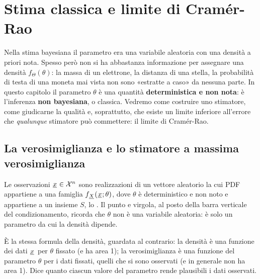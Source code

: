 \chapter{Stima classica e limite di Cramér-Rao}

Nella stima bayesiana il parametro era una variabile aleatoria con una densità a priori nota. Spesso però non si ha
abbastanza informazione per assegnare una densità $f_\Theta(\theta)$: la massa di un elettrone, la distanza di una
stella, la probabilità di testa di una moneta mai vista non sono «estratte a caso» da nessuna parte. In questo capitolo
il parametro $\theta$ è una quantità \textbf{deterministica e non nota}: è l'inferenza \textbf{non bayesiana}, o
classica. Vedremo come costruire uno stimatore, come giudicarne la qualità e, soprattutto, che esiste un limite
inferiore all'errore che \emph{qualunque} stimatore può commettere: il limite di Cramér-Rao.

\section{La verosimiglianza e lo stimatore a massima verosimiglianza}

Le osservazioni ${\mkern1mu\underline{x}\mkern1mu} \in \mathcal{X}^n$ sono realizzazioni di un vettore aleatorio la cui PDF appartiene a una
famiglia $f_{{\mkern1mu\underline{X}\mkern1mu}}({\mkern1mu\underline{x}\mkern1mu}; \theta)$, dove $\theta$ è deterministico e non noto e appartiene a un insieme $S$, lo
. Il punto e virgola, al posto della barra verticale del condizionamento, ricorda che $\theta$
non è una variabile aleatoria: è solo un parametro da cui la densità dipende.


È la stessa formula della densità, guardata al contrario: la densità è una funzione dei dati ${\mkern1mu\underline{x}\mkern1mu}$ per $\theta$
fissato (e ha area 1); la verosimiglianza è una funzione del parametro $\theta$ per i dati fissati, quelli che si sono
osservati (e in generale non ha area 1). Dice quanto ciascun valore del parametro rende plausibili i dati osservati.

